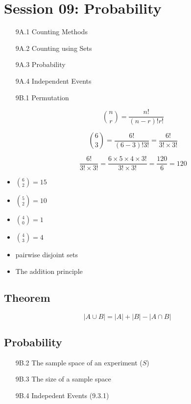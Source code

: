 \documentclass[a4paper,12pt]{article}
\begin{document}


\section*{Session 09: Probability}
\begin{itemize}
\item[9A.1] Counting Methods
\item[9A.2] Counting using Sets
\item[9A.3] Probability
\item[9A.4] Independent Events
\end{itemize}
\begin{itemize}
\item[9B.1] Permutation

\[ {n \choose r} = \frac{n!}{(n-r)! r!} \]


\[ {6 \choose 3} = \frac{6!}{(6-3)! 3!} = \frac{6!}{3! \times 3!}\]


\[ \frac{6!}{3! \times 3!} = \frac{6 \times 5 \times 4 \times 3!}{3! \times 3!} = \frac{120}{6} = 120\]
\end{itemize}

\begin{itemize}
\item ${6 \choose 2} = 15$
\item ${5 \choose 2} = 10$  
\item ${4 \choose 0} = 1$  
\item ${4 \choose 3} = 4$  
\end{itemize}

\begin{itemize}
\item pairwise disjoint sets
\item The addition principle
\end{itemize}
\subsection*{Theorem}
\[ |A \cup B| = |A| + |B| - |A \cap B|  \]

\subsection*{Probability}
\begin{itemize}
\item[9B.2] The sample space of an experiment ($S$)
\item[9B.3] The size of a sample space
\item[9B.4] Indepedent Events (9.3.1)
\end{itemize}
\end{document}
